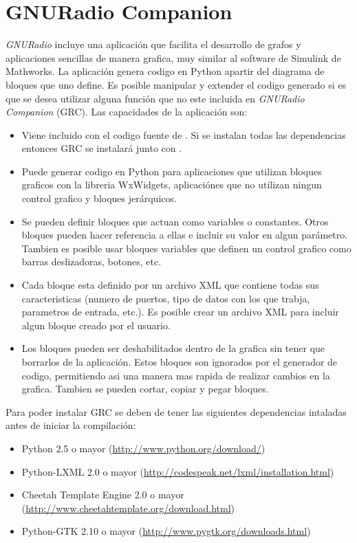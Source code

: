 
\chapter{GNURadio Companion}
\label{AppB}

\emph{GNURadio} incluye una aplicaci\'on que facilita el desarrollo de grafos y aplicaciones
sencillas de manera grafica, muy similar al software de Simulink de Mathworks. La aplicaci\'on
genera codigo en Python apartir del diagrama de bloques que uno define. Es posible manipular y
extender el codigo generado si es que se desea utilizar alguna funci\'on que no este incluida en
\emph{GNURadio Companion} (GRC). Las capacidades de la aplicaci\'on son:

\begin{itemize}
  \item Viene incluido con el codigo fuente de \gnuradio. Si se instalan todas las dependencias
  entonces GRC se instalar\'a junto con \gnuradio.
  \item Puede generar codigo en Python para aplicaciones que utilizan bloques graficos con la
  libreria WxWidgets, aplicaci\'ones que no utilizan ningun control grafico y bloques jer\'arquicos.
  \item Se pueden definir bloques que actuan como variables o constantes. Otros bloques pueden hacer
  referencia a ellas e incluir su valor en algun par\'ametro. Tambien es posible usar bloques
  variables que definen un control grafico como barras deslizadoras, botones, etc.
  \item Cada bloque esta definido por un archivo XML que contiene todas sus caracteristicas (numero
  de puertos, tipo de datos con los que trabja, parametros de entrada, etc.). Es posible crear un
  archivo XML para incluir algun bloque creado por el usuario.
  \item Los bloques pueden ser deshabilitados dentro de la grafica sin tener que borrarlos de la
  aplicaci\'on. Estos bloques son ignorados por el generador de codigo, permitiendo asi una manera
  mas rapida de realizar cambios en la grafica. Tambien se pueden cortar, copiar y pegar bloques.
\end{itemize}

Para poder instalar GRC se deben de tener las siguientes dependencias intaladas antes de iniciar la
compilaci\'on:

\begin{itemize}
  \item Python 2.5 o mayor (\url{http://www.python.org/download/})
  \item Python-LXML 2.0 o  mayor (\url{http://codespeak.net/lxml/installation.html})
  \item Cheetah Template Engine 2.0 o mayor (\url{http://www.cheetahtemplate.org/download.html})
  \item Python-GTK 2.10 o mayor (\url{http://www.pygtk.org/downloads.html})
\end{itemize}


